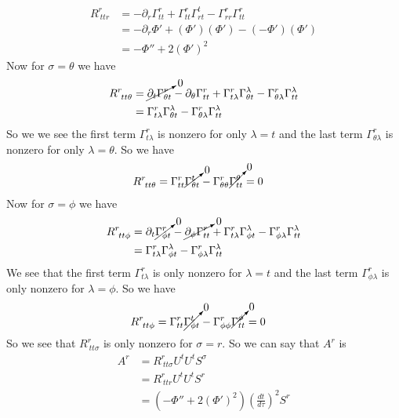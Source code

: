 \documentclass[11pt]{article}
\numberwithin{equation}{section}
\begin{document}
\begin{enumerate}[(a)]
\begin{align*}
R^{r}_{\ ttr} &= -\partial_{r}\Gamma^{r}_{t t} +\Gamma^{r}_{tt}\Gamma^{t}_{r t} - \Gamma^{r}_{rr}\Gamma^{r}_{t t}\\
&= -\partial_{r}\Phi' + (\Phi')(\Phi') - (-\Phi')(\Phi')\\
&= -\Phi'' + 2(\Phi')^2
\end{align*}
Now for $\sigma = \theta$ we have
\begin{align*}
R^{r}_{\ tt\theta} &= \cancelto{0}{\partial_{t}\Gamma^{r}_{\theta t}}-\partial_{\theta}\Gamma^{r}_{t t} +\Gamma^{r}_{t\lambda}\Gamma^{\lambda}_{\theta t} - \Gamma^{r}_{\theta\lambda}\Gamma^{\lambda}_{t t}\\
&= \Gamma^{r}_{t\lambda}\Gamma^{\lambda}_{\theta t} - \Gamma^{r}_{\theta\lambda}\Gamma^{\lambda}_{t t}
\end{align*}
So we we see the first term $\Gamma^{r}_{t\lambda}$ is nonzero for only $\lambda = t$ and the last term $\Gamma^{r}_{\theta\lambda}$ is nonzero for only $\lambda = \theta$. So we have
\begin{align*}
R^{r}_{\ tt\theta} &= \Gamma^{r}_{tt}\cancelto{0}{\Gamma^{t}_{\theta t}} - \Gamma^{r}_{\theta\theta}\cancelto{0}{\Gamma^{\theta}_{t t}} = 0
\end{align*}
Now for $\sigma = \phi$ we have
\begin{align*}
R^{r}_{\ tt\phi} &= \partial_{t}\cancelto{0}{\Gamma^{r}_{\phi t}}- \cancelto{0}{\partial_{\phi}\Gamma^{r}_{t t}} +\Gamma^{r}_{t\lambda}\Gamma^{\lambda}_{\phi t} - \Gamma^{r}_{\phi\lambda}\Gamma^{\lambda}_{t t}\\
&= \Gamma^{r}_{t\lambda}\Gamma^{\lambda}_{\phi t} - \Gamma^{r}_{\phi\lambda}\Gamma^{\lambda}_{t t}
\end{align*}
We see that the first term $\Gamma^{r}_{t\lambda}$ is only nonzero for $\lambda = t$ and the last term $\Gamma^{r}_{\phi\lambda}$ is only nonzero for $\lambda = \phi$. So we have
\begin{align*}
R^{r}_{\ tt\phi} &= \Gamma^{r}_{tt}\cancelto{0}{\Gamma^{t}_{\phi t}} - \Gamma^{r}_{\phi\phi}\cancelto{0}{\Gamma^{\phi}_{t t}} = 0
\end{align*}
So we see that $R^{r}_{\ tt\sigma}$ is only nonzero for $\sigma = r$. So we can say that $A^r$ is
\begin{align*}
A^{r} &= R^{r}_{\ tt\sigma}U^{t}U^{t}S^{\sigma}\\
&= R^{r}_{\ ttr}U^{t}U^{t}S^{r}\\
&= \left(-\Phi'' + 2(\Phi')^2\right)\left(\frac{dt}{d\tau}\right)^2S^{r}

\end{align*}
\end{enumerate}
\end{document}
